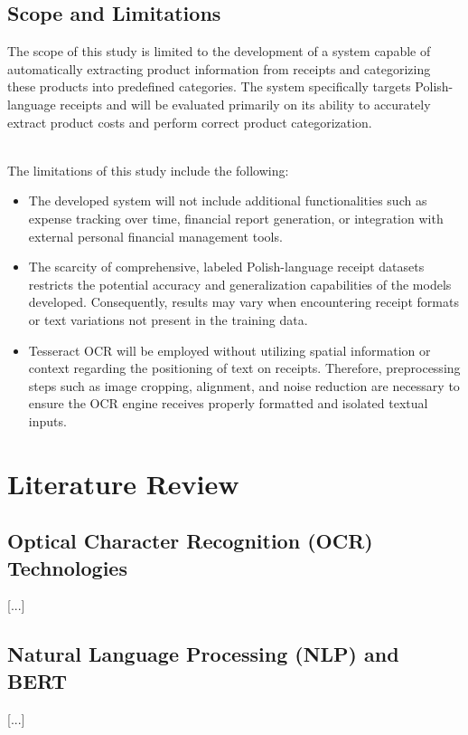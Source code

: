 \documentclass{SGGW-thesis-EN}
\begin{document}
\newpage
\section{Scope and Limitations}

The scope of this study is limited to the development of a system capable of automatically extracting product information from receipts and categorizing these products into predefined categories. 
The system specifically targets Polish-language receipts and will be evaluated primarily on its ability to accurately extract product costs and perform correct product categorization.

\noindent \\The limitations of this study include the following:

\begin{itemize}
    \item The developed system will not include additional functionalities such as expense tracking over time, financial report generation, or integration with external personal financial management tools.
    \item The scarcity of comprehensive, labeled Polish-language receipt datasets restricts the potential accuracy and generalization capabilities of the models developed. Consequently, results may vary when encountering receipt formats or text variations not present in the training data.
    \item Tesseract OCR will be employed without utilizing spatial information or context regarding the positioning of text on receipts. Therefore, preprocessing steps such as image cropping, alignment, and noise reduction are necessary to ensure the OCR engine receives properly formatted and isolated textual inputs.
\end{itemize}

\chapter{Literature Review}

\section{Optical Character Recognition (OCR) Technologies}
[...]

\section{Natural Language Processing (NLP) and BERT}
[...]
\end{document}
